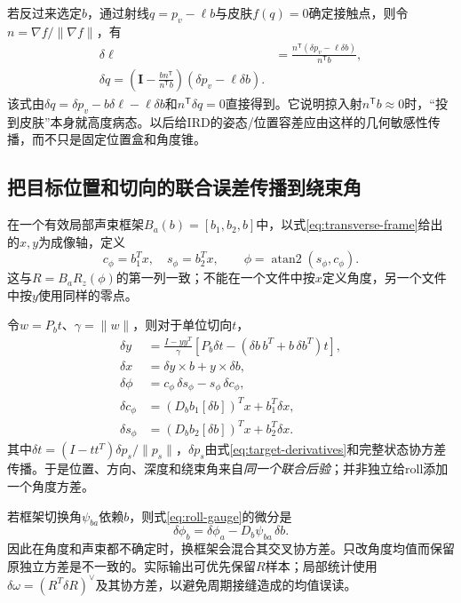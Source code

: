 \documentclass[UTF8,11pt,a4paper,fontset=fandol]{ctexart}
\numberwithin{equation}{section}
\theoremstyle{plain}
\theoremstyle{definition}
\theoremstyle{remark}
\newcommand{\Id}{\mathbf I}\newcommand{\T}{^{\mathsf T}}
\begin{document}
若反过来选定$b$，通过射线$q=p_v-\ell b$与皮肤$f(q)=0$确定接触点，则令$n=\nabla f/\|\nabla f\|$，有
\begin{align}
 \delta\ell&=\frac{n\T(\delta p_v-\ell\delta b)}{n\T b},\\
 \boxed{\delta q=\left(\Id-\frac{bn\T}{n\T b}\right)
 (\delta p_v-\ell\delta b).}
 \label{eq:skin-projection-jac}
\end{align}
该式由$\delta q=\delta p_v-b\delta\ell-\ell\delta b$和$n\T\delta q=0$直接得到。它说明掠入射$n\T b\approx0$时，“投到皮肤”本身就高度病态。以后给IRD的姿态/位置容差应由这样的几何敏感性传播，而不只是固定位置盒和角度锥。


\subsection{把目标位置和切向的联合误差传播到绕束角}
在一个有效局部声束框架$B_a(b)=[b_1,b_2,b]$中，以式\eqref{eq:transverse-frame}给出的$x,y$为成像轴，定义
\begin{equation}
 c_\phi=b_1^Tx,\quad s_\phi=b_2^Tx,\qquad
 \phi=\operatorname{atan2}(s_\phi,c_\phi).
 \label{eq:roll-extraction}
\end{equation}
这与$R=B_aR_z(\phi)$的第一列一致；不能在一个文件中按$x$定义角度，另一个文件中按$y$使用同样的零点。

令$w=P_bt$、$\gamma=\|w\|$，则对于单位切向$t$，
\begin{align}
 \delta y&=\frac{I-yy^T}{\gamma}
 \left[P_b\delta t-(\delta b\,b^T+b\,\delta b^T)t\right],\\
 \delta x&=\delta y\times b+y\times\delta b,\\
 \delta\phi&=c_\phi\,\delta s_\phi-s_\phi\,\delta c_\phi,\\
 \delta c_\phi&=(D_bb_1[\delta b])^Tx+b_1^T\delta x,\\
 \delta s_\phi&=(D_bb_2[\delta b])^Tx+b_2^T\delta x.
 \label{eq:roll-jac}
\end{align}
其中$\delta t=(I-tt^T)\delta p_s/\|p_s\|$，$\delta p_s$由式\eqref{eq:target-derivatives}和完整状态协方差传播。于是位置、方向、深度和绕束角来自\emph{同一个联合后验}；并非独立给roll添加一个角度方差。

若框架切换角$\psi_{ba}$依赖$b$，则式\eqref{eq:roll-gauge}的微分是
\begin{equation}
 \delta\phi_b=\delta\phi_a-D_b\psi_{ba}\,\delta b.
 \label{eq:roll-gauge-cov}
\end{equation}
因此在角度和声束都不确定时，换框架会混合其交叉协方差。只改角度均值而保留原独立方差是不一致的。实际输出可优先保留$R$样本；局部统计使用$\delta\omega=(R^T\delta R)^\vee$及其协方差，以避免周期接缝造成的均值误读。
\end{document}
